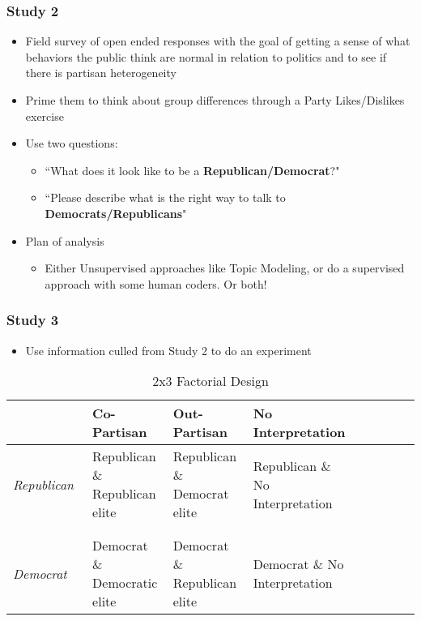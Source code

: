 \documentclass[aspectratio=1610]{beamer}
\begin{document}
	\begin{frame}
		\frametitle{Study 2}
		\begin{itemize}
			\item Field survey of open ended responses with the goal of getting a sense of what behaviors the public think are normal in relation to politics and to see if there is partisan heterogeneity
			\item Prime them to think about group differences through a Party Likes/Dislikes exercise
			\item Use two questions:
			\begin{itemize}
				\item ``What does it look like to be a \textbf{Republican/Democrat}?"
				\item ``Please describe what is the right way to talk to \textbf{Democrats/Republicans}"
			\end{itemize}
			\item Plan of analysis
			\begin{itemize}
				\item Either Unsupervised approaches like Topic Modeling, or do a supervised approach with some human coders. Or both!
			\end{itemize}
		\end{itemize}
	\end{frame}
	\begin{frame}
		\frametitle{Study 3}
		\begin{itemize}
			\item Use information culled from Study 2 to do an experiment
		\end{itemize}
		\begin{table}[hbt!]
			\caption{2x3 Factorial Design}
			\begin{tabular}{p{0.2\linewidth}p{0.2\linewidth}p{0.2\linewidth}p{0.2\linewidth}p{0.2\linewidth}}
				\textbf{} & \textbf{Co-Partisan} & \textbf{Out-Partisan} & \textbf{No Interpretation}\\
				\midrule
				\textit{Republican} & Republican \& Republican elite & Republican \& Democrat elite & Republican \& No Interpretation \\ [1ex]
				\\
				\hdashline 
				\\ 
				\textit{Democrat} & Democrat \& Democratic elite & Democrat \& Republican elite & Democrat \& No Interpretation \\
				\hline
			\end{tabular}
		\end{table}\textbf{}
	\end{frame}
\end{document}
